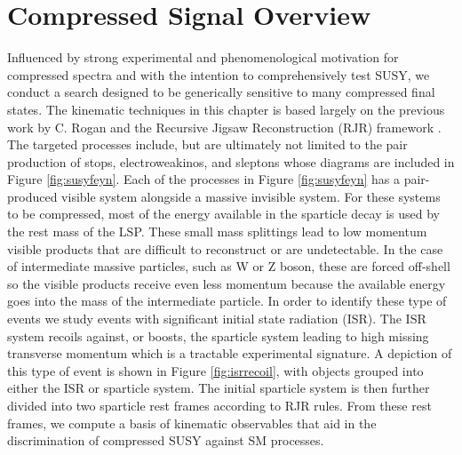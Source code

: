 \section{Compressed Signal Overview}
Influenced by strong experimental and phenomenological motivation for compressed spectra and with the intention to comprehensively test SUSY, we conduct a search designed to be generically sensitive to many compressed final states. The kinematic techniques in this chapter is based largely on the previous work by C. Rogan and the Recursive Jigsaw Reconstruction (RJR) framework \cite{AN}\cite{PhysRevD.96.112007}. The targeted processes include, but are ultimately not limited to the pair production of stops, electroweakinos, and sleptons whose diagrams are included in Figure \ref{fig:susyfeyn}.  
Each of the processes in Figure \ref{fig:susyfeyn} has a pair-produced visible system alongside a massive invisible system. For these systems to be compressed, most of the energy available in the sparticle decay is used by the rest mass of the LSP. These small mass splittings lead to low momentum visible products that are difficult to reconstruct or are undetectable. In the case of intermediate massive particles, such as W or Z boson, these are forced off-shell so the visible products receive even less momentum because the available energy goes into the mass of the intermediate particle. In order to identify these type of events we study events with significant initial state radiation (ISR). The ISR system recoils against, or boosts, the sparticle system leading to high missing transverse momentum which is a tractable experimental signature. A depiction of this type of event is shown in Figure \ref{fig:isrrecoil}, with objects grouped into either the ISR or sparticle system. The initial sparticle system is then further divided into two sparticle rest frames according to RJR rules. From these rest frames, we compute a basis of kinematic observables that aid in the discrimination of compressed SUSY against SM processes.

